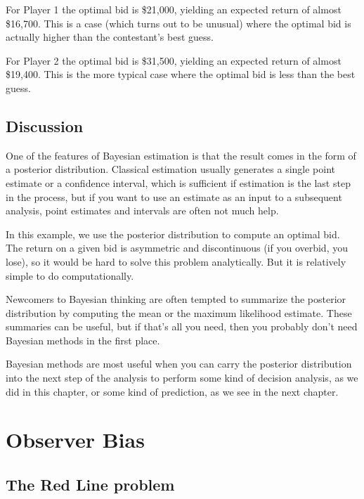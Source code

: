 \documentclass[12pt]{book}
\theoremstyle{exercise}
\begin{document}
For Player 1 the optimal bid is \$21,000, yielding an expected
return of almost \$16,700.  This is a case (which turns out
to be unusual) where the optimal bid is actually higher than
the contestant's best guess.

For Player 2 the optimal bid is \$31,500, yielding an expected
return of almost \$19,400.  This is the more typical case where
the optimal bid is less than the best guess.


\section{Discussion}

One of the features of Bayesian estimation is that the
result comes in the form of a posterior distribution.  Classical
estimation usually generates a single point estimate or a confidence
interval, which is sufficient if estimation is the last step in the
process, but if you want to use an estimate as an input to a
subsequent analysis, point estimates and intervals are often not much
help.

In this example, we use the posterior distribution
to compute an optimal bid.  The return on a given bid is asymmetric
and discontinuous (if you overbid, you lose), so it would be hard to
solve this problem analytically.  But it is relatively simple to do
computationally.

Newcomers to Bayesian thinking are often tempted to summarize the
posterior distribution by computing the mean or the maximum
likelihood estimate.  These summaries can be useful, but if that's
all you need, then you probably don't need Bayesian methods in the
first place.

Bayesian methods are most useful when you can carry the posterior
distribution into the next step of the analysis to perform some
kind of decision analysis, as we did in this chapter, or some kind of
prediction, as we see in the next chapter.




\chapter{Observer Bias}
\label{observer}

\section{The Red Line problem}
\end{document}
